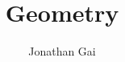 
\usepackage{bbm}
\usepackage{nicefrac}
\usepackage{tikz-cd}
\author{Jonathan Gai}
\title{Geometry}


\maketitle
\tableofcontents
{}
